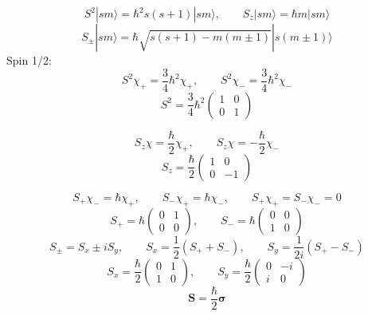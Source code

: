 \documentclass[a4paper,norsk, 10pt]{article}
\begin{document}
\begin{equation}
S^2|sm\rangle = \hbar^2s(s+1)|sm\rangle, \qquad S_z |sm\rangle = \hbar m|sm\rangle
\end{equation}
\begin{equation}
S_{\pm}|sm\rangle = \hbar\sqrt{s(s+1) -m(m\pm 1)}|s(m\pm1)\rangle
\end{equation}
Spin 1/2:
\begin{equation}
S^2\chi_+ = \frac{3}{4}\hbar^2\chi_+, \qquad S^2\chi_- = \frac{3}{4}\hbar^2\chi_-
\end{equation}
\begin{equation}
S^2 = \frac{3}{4}\hbar^2
\begin{pmatrix}
1 & 0\\
0 & 1
\end{pmatrix}
\end{equation}

\begin{equation}
S_z\chi = \frac{\hbar}{2}\chi_+,\qquad S_z\chi = -\frac{\hbar}{2}\chi_-
\end{equation}
\begin{equation}
S_z = \frac{\hbar}{2}
\begin{pmatrix}
1 & 0\\
0 & -1
\end{pmatrix}
\end{equation}

\begin{equation}
S_+ \chi_- = \hbar\chi_+, \qquad S_-\chi_+ = \hbar\chi_-, \qquad S_+\chi_+ = S_-\chi_- = 0
\end{equation}
\begin{equation}
S_+ = \hbar
\begin{pmatrix}
0 & 1\\
0 & 0
\end{pmatrix},\qquad
S_- = \hbar
\begin{pmatrix}
0 & 0\\
1 & 0
\end{pmatrix}
\end{equation}
\begin{equation}
S_{\pm} = S_x \pm iS_y,\qquad S_x = \frac{1}{2}(S_+ + S_-),\qquad S_y = \frac{1}{2i}(S_+ - S_-)
\end{equation}
\begin{equation}
S_x = \frac{\hbar}{2}
\begin{pmatrix}
0 & 1\\
1 & 0
\end{pmatrix},\qquad
S_y = \frac{\hbar}{2}
\begin{pmatrix}
0 & -i\\
i & 0
\end{pmatrix}
\end{equation}
\begin{equation}
\mathbf{S} = \frac{\hbar}{2}\mathbf{\sigma}
\end{equation}
\end{document}
